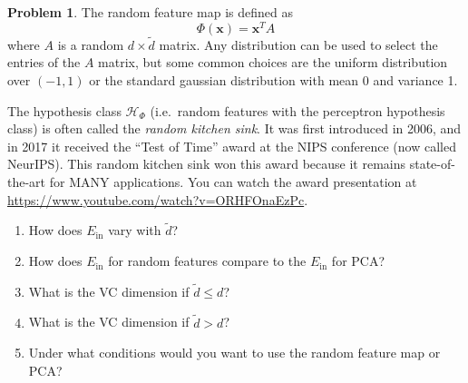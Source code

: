 \documentclass[10pt]{exam}
\theoremstyle{definition}
\newtheorem{problem}{Problem}
\newcommand{\Ein}{E_{\text{in}}}
\newcommand{\trans}[1]{{#1}^{T}}
\newcommand{\x}{\mathbf x}
\newcommand{\HH}[1]{\mathcal H_{\text{#1}}}
\begin{document}
\begin{problem}
    The random feature map is defined as 
    \begin{equation}
        \Phi(\x) = \trans\x A
    \end{equation}
    where $A$ is a random $d\times 	\tilde d$ matrix.
    Any distribution can be used to select the entries of the $A$ matrix, but some common choices are the uniform distribution over $(-1,1)$ or the standard gaussian distribution with mean 0 and variance 1.

    The hypothesis class $\HH{$\Phi$}$ (i.e.\ random features with the perceptron hypothesis class) is often called the \emph{random kitchen sink}.
    It was first introduced in 2006, and in 2017 it received the ``Test of Time'' award at the NIPS conference (now called NeurIPS).
    This random kitchen sink won this award because it remains state-of-the-art for MANY applications.
    You can watch the award presentation at \url{https://www.youtube.com/watch?v=ORHFOnaEzPc}. %

    \begin{enumerate}
        \item
            How does $\Ein$ vary with $	\tilde d$?
            \vspace{3in}

        \item
            How does $\Ein$ for random features compare to the $\Ein$ for PCA?
            \vspace{3in}

            \newpage
        \item
            What is the VC dimension if $	\tilde d \le d$?
            \vspace{4in}

        \item
            What is the VC dimension if $	\tilde d > d$?
            \vspace{3in}

            \newpage
        \item
            Under what conditions would you want to use the random feature map or PCA?
    \end{enumerate}
\end{problem}
\end{document}
